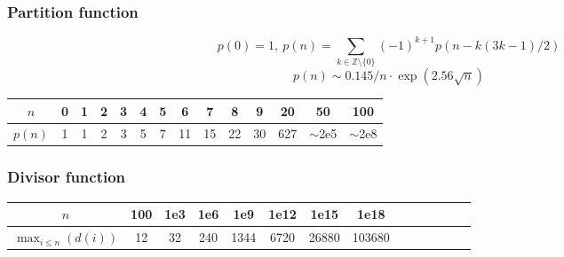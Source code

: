 \subsubsection{Partition function}
\[ p(0) = 1,\ p(n) = \sum_{k \in \mathbb Z \setminus \{0\}}{(-1)^{k+1} p(n - k(3k-1) / 2)} \]
\[ p(n) \sim 0.145 / n \cdot \exp(2.56 \sqrt{n}) \]

\begin{center}
\begin{tabular}{c|c@{\ }c@{\ }c@{\ }c@{\ }c@{\ }c@{\ }c@{\ }c@{\ }c@{\ }c@{\ }c@{\ }c@{\ }c}
        $n$    & 0 & 1 & 2 & 3 & 4 & 5 & 6  & 7  & 8  & 9  & 20  & 50  & 100 \\ \hline
        $p(n)$ & 1 & 1 & 2 & 3 & 5 & 7 & 11 & 15 & 22 & 30 & 627 & $\mathtt{\sim}$2e5 & $\mathtt{\sim}$2e8 \\
\end{tabular}
\end{center}

\subsubsection{Divisor function}
\begin{center}
\begin{tabular}{c|c@{\ }c@{\ }c@{\ }c@{\ }c@{\ }c@{\ }c@{\ }c@{\ }c@{\ }c@{\ }c@{\ }c@{\ }c}
        $n$                      & 100 & 1e3 & 1e6 & 1e9  & 1e12 & 1e15  & 1e18 \\ \hline
        $\max _ {i\leq n}(d(i))$ & 12  & 32  & 240 & 1344 & 6720 & 26880 & 103680 \\
\end{tabular}
\end{center}


